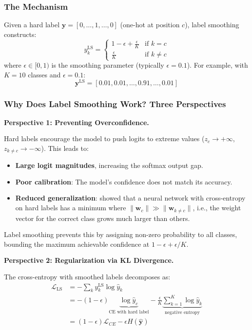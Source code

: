 \subsubsection{The Mechanism}

Given a hard label $\mathbf{y} = [0, \ldots, 1, \ldots, 0]$ (one-hot at position $c$), label smoothing constructs:
\begin{equation}
y_k^{\text{LS}} = 
\begin{cases}
1 - \epsilon + \frac{\epsilon}{K} & \text{if } k = c \\
\frac{\epsilon}{K} & \text{if } k \neq c
\end{cases}
\end{equation}
where $\epsilon \in [0, 1)$ is the smoothing parameter (typically $\epsilon = 0.1$). For example, with $K = 10$ classes and $\epsilon = 0.1$:
\begin{equation}
\mathbf{y}^{\text{LS}} = [0.01, 0.01, \ldots, 0.91, \ldots, 0.01]
\end{equation}

\subsubsection{Why Does Label Smoothing Work? Three Perspectives}

\textbf{Perspective 1: Preventing Overconfidence.}

Hard labels encourage the model to push logits to extreme values ($z_c \to +\infty$, $z_{k \neq c} \to -\infty$). This leads to:
\begin{itemize}
    \item \textbf{Large logit magnitudes}, increasing the softmax output gap.
    \item \textbf{Poor calibration}: The model's confidence does not match its accuracy.
    \item \textbf{Reduced generalization}: \cite{muller2019when} showed that a neural network with cross-entropy on hard labels has a minimum where $\|\mathbf{w}_c\| \gg \|\mathbf{w}_{k \neq c}\|$, i.e., the weight vector for the correct class grows much larger than others.
\end{itemize}

Label smoothing prevents this by assigning non-zero probability to all classes, bounding the maximum achievable confidence at $1 - \epsilon + \epsilon/K$.

\textbf{Perspective 2: Regularization via KL Divergence.}

The cross-entropy with smoothed labels decomposes as:
\begin{align}
\mathcal{L}_{\text{LS}} &= -\sum_k y_k^{\text{LS}} \log \hat{y}_k \\
&= -(1 - \epsilon)\underbrace{\log \hat{y}_c}_{\text{CE with hard label}} - \frac{\epsilon}{K}\underbrace{\sum_{k=1}^{K}\log \hat{y}_k}_{\text{negative entropy}} \\
&= (1 - \epsilon)\mathcal{L}_{CE} - \epsilon H(\hat{\mathbf{y}})
\end{align}


